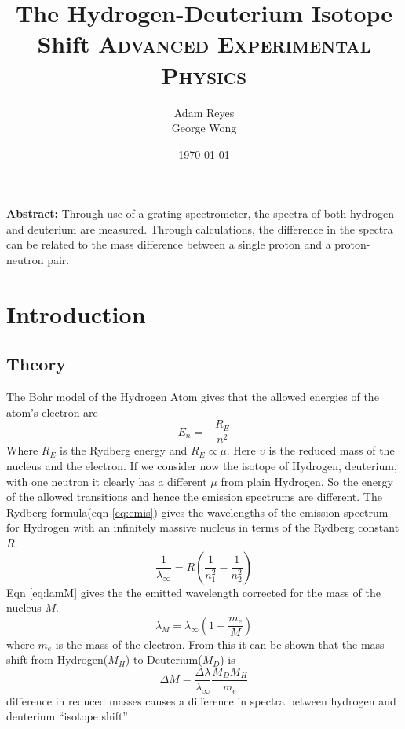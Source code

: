 \documentclass[paper=a4, fontsize=11pt]{scrartcl} %
\title{	
The Hydrogen-Deuterium Isotope Shift
\horrule{0.5pt}
\normalfont \normalsize 
\textsc{Advanced Experimental Physics }
}
\author{Adam Reyes \\ George Wong} %
\date{\normalsize\today} %
\numberwithin{equation}{section}
\numberwithin{figure}{section}
\numberwithin{table}{section}
\begin{document}
\maketitle



\textbf{Abstract:}
Through use of a grating spectrometer, the spectra of both hydrogen and deuterium are measured. Through calculations, the difference in the spectra can be related to the mass difference between a single proton and a proton-neutron pair.

\section{Introduction}

\subsection{Theory}

The Bohr model of the Hydrogen Atom gives that the allowed energies of
the atom's electron are
\begin{equation}
\label{eq:Hen}
E_n = -\frac{R_E}{n^2}
\end{equation}
Where $R_E$ is the Rydberg energy and $R_E \propto \mu$. Here
$\upsilon$ is the reduced mass of the nucleus and the electron. If we
consider now the isotope of Hydrogen, deuterium, with one neutron it
clearly has a different $\mu$ from plain Hydrogen. So the energy of
the allowed transitions and hence the emission spectrums are
different. The Rydberg formula(eqn \ref{eq:emis}) gives the wavelengths of the emission
spectrum for Hydrogen with an infinitely massive nucleus in terms of
the Rydberg constant $R$.
\begin{equation}
\label{eq:emis}
\frac{1}{\lambda_\infty} = R(\frac{1}{n_1 ^2}-\frac{1}{n_2 ^2})
\end{equation}
Eqn \ref{eq:lamM} gives the the emitted wavelength corrected for the
mass of the nucleus $M$.
\begin{equation}\label{eq:lamM}
\lambda_M = \lambda_{\infty} (1 + \frac{m_e}{M})
\end{equation}
where $m_e$ is the mass of the electron. From this it can be shown
that the mass shift from Hydrogen($M_H$) to Deuterium($M_D$) is
\begin{equation}
\Delta M = \frac{\Delta \lambda}{\lambda_\infty}\frac{M_D M_H}{m_e}
\end{equation}
difference in reduced masses causes a difference in spectra between hydrogen and deuterium ``isotope shift''
\end{document}
